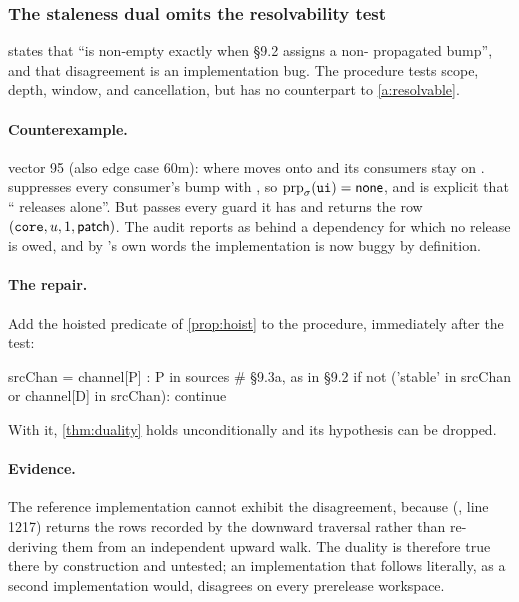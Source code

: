 \subsubsection{The staleness dual omits the resolvability test}

\begin{obligation}
\label{ob:duality}
 states that  ``is non-empty exactly when
\S9.2 assigns  a non- propagated bump'', and that
disagreement is an implementation bug. The procedure tests scope, depth,
window, and cancellation, but has no counterpart to \cref{a:resolvable}.
\end{obligation}

\paragraph{Counterexample.} \SPEC{} vector 95 (also edge case 60m):
 where  moves onto  and its
consumers stay on .  suppresses every consumer's bump
with , so $\mathrm{prp}_{\sigma}(\texttt{ui}) = \mathsf{none}$, and \SPEC{} is
explicit that `` releases  alone''. But
 passes every guard it has and returns the row
$(\texttt{core}, u, 1, \mathsf{patch})$. The audit reports  as behind a
dependency for which no release is owed, and by 's own words the
implementation is now buggy by definition.

\paragraph{The repair.} Add the hoisted predicate of \cref{prop:hoist} to the
procedure, immediately after the  test:
\begin{speccode}
        srcChan = { channel[P] : P in sources }        # §9.3a, as in §9.2
        if not ('stable' in srcChan or channel[D] in srcChan):  continue
\end{speccode}
With it, \cref{thm:duality} holds unconditionally and its hypothesis can be
dropped.

\paragraph{Evidence.} The reference implementation cannot exhibit the
disagreement, because 
(, line 1217) returns the rows
recorded by the downward traversal rather than re-deriving them from an
independent upward walk. The duality is therefore true there by construction
and untested; an implementation that follows  literally, as a
second implementation would, disagrees on every prerelease workspace.

